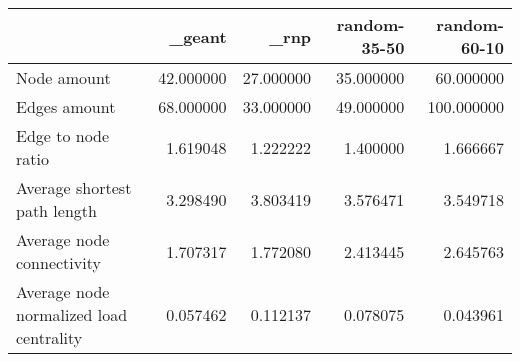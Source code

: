 \begin{tabular}{lrrrr}
\toprule
 & _geant & _rnp & random-35-50 & random-60-10 \\
\midrule
Node amount & 42.000000 & 27.000000 & 35.000000 & 60.000000 \\
Edges amount & 68.000000 & 33.000000 & 49.000000 & 100.000000 \\
Edge to node ratio & 1.619048 & 1.222222 & 1.400000 & 1.666667 \\
Average shortest path length & 3.298490 & 3.803419 & 3.576471 & 3.549718 \\
Average node connectivity & 1.707317 & 1.772080 & 2.413445 & 2.645763 \\
Average node normalized load centrality & 0.057462 & 0.112137 & 0.078075 & 0.043961 \\
\bottomrule
\end{tabular}
